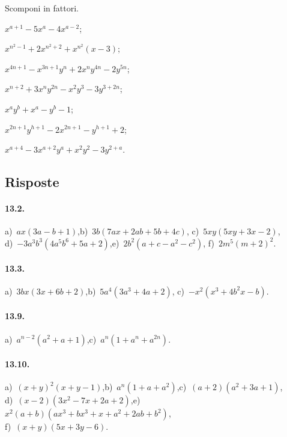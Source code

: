 \begin{esercizio}[\Ast]
 \label{ese:13.109}
 Scomponi in fattori.
 \begin{multicols}{2}
 \begin{enumeratea}
  \item $x^{a+1}-5x^{a}-4x^{a-2}$;
\item $x^{n^{2}-1}+2x^{n^{2}+2}+x^{n^{2}}(x-3)$;
\item $x^{4n+1}-x^{3n+1}y^{n}+2x^{n}y^{4n}-2y^{5n}$;
\item $x^{n+2}+3x^{n}y^{2n}-x^{2}y^{3}-3y^{3+2n}$;
\item $x^{a}y^{b}+x^{a}-y^{b}-1$;
\item $x^{2n+1}y^{h+1}-2x^{2n+1}-y^{h+1}+2$;
\item $x^{a+4}-3x^{a+2}y^{a}+x^{2}y^{2}-3y^{2+a}$.
 \end{enumeratea}
 \end{multicols}
\end{esercizio}

\subsection{Risposte}

\paragraph{13.2.}
a)~$ax(3a-b+1)$,\quad b)~$3b(7ax+2ab+5b+4c)$, \quad c)~$5xy(5xy+3x-2)$,\protect\\ d)~$-3a^{3}b^{3}\left(4a^{5}b^{6}+5a+2\right)$,\quad e)~$2b^{2}(a+c-a^{2}-c^{2})$, \quad f)~$2m^{5}\left(m+2\right)^{2}$.

\paragraph{13.3.}
a)~$3bx(3x+6b+2)$,\quad b)~$5a^{4}\left(3a^{3}+4a+2\right)$, \quad c)~$-x^{2}\left(x^{3}+4b^{2}x-b\right)$.

\paragraph{13.9.}
a)~$a^{n-2}\left(a^{2}+a+1\right)$,\quad c)~$a^{n}\left(1+a^{n}+a^{2n}\right)$.

\paragraph{13.10.}
a)~$(x+y)^{2}(x+y-1)$,\quad b)~$a^{n}(1+a+a^{2})$,\quad c)~$(a+2)\left(a^{2}+3a+1\right)$, \protect\\ d)~$(x-2)\left(3x^2-7x+2a+2\right)$,\quad e)~$x^{2}(a+b)(ax^{3}+bx^{3}+x+a^{2}+2ab+b^{2})$,\protect\\ f)~$(x+y)\left(5x+3y-6\right)$.

